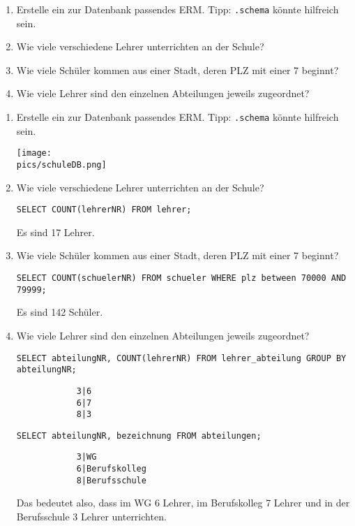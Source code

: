 \begin{Exercise}[title={Bearbeite folgende Aufgaben}, label=Funktionen]
	\begin{enumerate}
		\item Erstelle ein zur Datenbank passendes ERM. Tipp: \lstinline!.schema! könnte hilfreich sein.
		\item Wie viele verschiedene Lehrer unterrichten an der Schule?
		\item Wie viele Schüler kommen aus einer Stadt, deren PLZ mit einer 7 beginnt?
		\item Wie viele Lehrer sind den einzelnen Abteilungen jeweils zugeordnet?
	\end{enumerate}
\end{Exercise}
\begin{Answer}[ref=Funktionen]
	\begin{enumerate}
		\item Erstelle ein zur Datenbank passendes ERM. Tipp: \lstinline!.schema! könnte hilfreich sein.

		\texttt{[image: \\pics/schuleDB.png]}
		\item Wie viele verschiedene Lehrer unterrichten an der Schule?

		\lstinline!SELECT COUNT(lehrerNR) FROM lehrer;!

		Es sind 17 Lehrer.
		\item Wie viele Schüler kommen aus einer Stadt, deren PLZ mit einer 7 beginnt?

		\lstinline!SELECT COUNT(schuelerNR) FROM schueler WHERE plz between 70000 AND 79999;!

		Es sind 142 Schüler.
		\item Wie viele Lehrer sind den einzelnen Abteilungen jeweils zugeordnet?

		\lstinline[breaklines=true]!SELECT abteilungNR, COUNT(lehrerNR) FROM lehrer_abteilung GROUP BY abteilungNR;!

		\begin{lstlisting}
			3|6
			6|7
			8|3\end{lstlisting}
		\lstinline!SELECT abteilungNR, bezeichnung FROM abteilungen;!\\
		\begin{lstlisting}
			3|WG
			6|Berufskolleg
			8|Berufsschule\end{lstlisting}
		Das bedeutet also, dass im WG 6 Lehrer, im Berufskolleg 7 Lehrer und in der Berufsschule 3 Lehrer unterrichten.
	\end{enumerate}
\end{Answer}